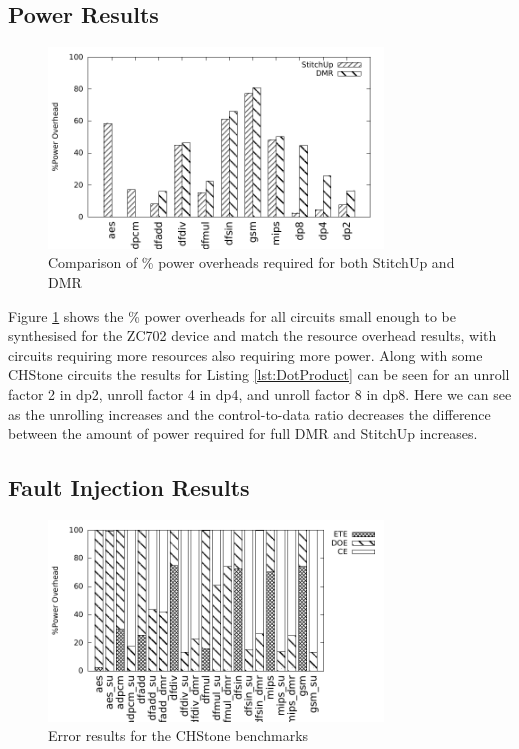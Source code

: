 \subsection{Power Results}
\begin{figure}[h]
\centering
\includegraphics[width=3.5in]{./graphs/power_results.pdf}
\caption{Comparison of \% power overheads required for both StitchUp and DMR}
\label{fig:power_res}
\end{figure}

Figure \ref{fig:power_res} shows the \% power overheads for all circuits small enough to be synthesised for the ZC702 device and match the
resource overhead results, with circuits requiring more resources also requiring more power.
Along with some CHStone circuits the results for Listing \ref{lst:DotProduct} can be seen for an unroll factor 2 in dp2, unroll factor 4 in dp4,
and unroll factor 8 in dp8. 
Here we can see as the unrolling increases and the control-to-data ratio decreases the difference between the amount
of power required for full DMR and StitchUp increases.

\subsection{Fault Injection Results}

\begin{figure}[h]
\centering
\includegraphics[width=3.5in]{./graphs/errors_res.pdf}
\caption{Error results for the CHStone benchmarks}
\label{fig:error_res}
\end{figure}

